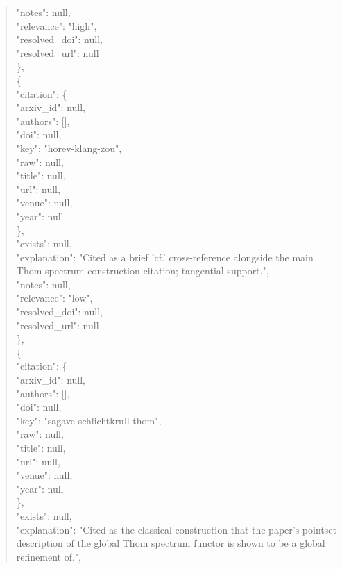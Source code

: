 \documentclass[11pt]{article}
\begin{document}
\begin{quote}
      "notes": null,\\
      "relevance": "high",\\
      "resolved\_doi": null,\\
      "resolved\_url": null\\
    \},\\
    \{\\
      "citation": \{\\
        "arxiv\_id": null,\\
        "authors": [],\\
        "doi": null,\\
        "key": "horev-klang-zou",\\
        "raw": null,\\
        "title": null,\\
        "url": null,\\
        "venue": null,\\
        "year": null\\
      \},\\
      "exists": null,\\
      "explanation": "Cited as a brief 'cf.' cross-reference alongside the main Thom spectrum construction citation; tangential support.",\\
      "notes": null,\\
      "relevance": "low",\\
      "resolved\_doi": null,\\
      "resolved\_url": null\\
    \},\\
    \{\\
      "citation": \{\\
        "arxiv\_id": null,\\
        "authors": [],\\
        "doi": null,\\
        "key": "sagave-schlichtkrull-thom",\\
        "raw": null,\\
        "title": null,\\
        "url": null,\\
        "venue": null,\\
        "year": null\\
      \},\\
      "exists": null,\\
      "explanation": "Cited as the classical construction that the paper's pointset description of the global Thom spectrum functor is shown to be a global refinement of.",\\

\end{quote}
\end{document}
